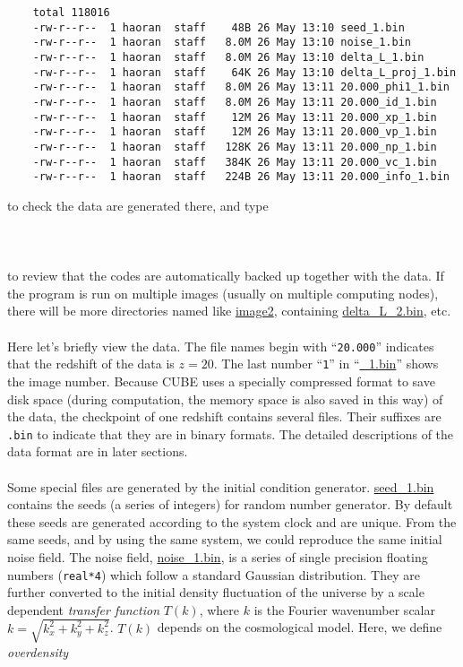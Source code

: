 \documentclass[12pt]{article}
\begin{document}
\begin{verbatim}
    total 118016
    -rw-r--r--  1 haoran  staff    48B 26 May 13:10 seed_1.bin
    -rw-r--r--  1 haoran  staff   8.0M 26 May 13:10 noise_1.bin
    -rw-r--r--  1 haoran  staff   8.0M 26 May 13:10 delta_L_1.bin
    -rw-r--r--  1 haoran  staff    64K 26 May 13:10 delta_L_proj_1.bin
    -rw-r--r--  1 haoran  staff   8.0M 26 May 13:11 20.000_phi1_1.bin
    -rw-r--r--  1 haoran  staff   8.0M 26 May 13:11 20.000_id_1.bin
    -rw-r--r--  1 haoran  staff    12M 26 May 13:11 20.000_xp_1.bin
    -rw-r--r--  1 haoran  staff    12M 26 May 13:11 20.000_vp_1.bin
    -rw-r--r--  1 haoran  staff   128K 26 May 13:11 20.000_np_1.bin
    -rw-r--r--  1 haoran  staff   384K 26 May 13:11 20.000_vc_1.bin
    -rw-r--r--  1 haoran  staff   224B 26 May 13:11 20.000_info_1.bin
\end{verbatim}
to check the data are generated there, and type
\\\\
\\\\
to review that the codes are automatically backed up together with the data. If the program is run on multiple images (usually on multiple computing nodes), there will be more directories named like \url{image2}, containing \url{delta_L_2.bin}, etc.
\\\\
Here let's briefly view the data. The file names begin with ``{\tt 20.000}'' indicates that the redshift of the data is $z=20$. The last number ``{\tt 1}'' in ``\url{_1.bin}'' shows the image number. Because CUBE uses a specially compressed format to save disk space (during computation, the memory space is also saved in this way) of the data, the checkpoint of one redshift contains several files. Their suffixes are {\tt *.bin} to indicate that they are in binary formats. The detailed descriptions of the data format are in later sections.
\\\\
Some special files are generated by the initial condition generator. \url{seed_1.bin} contains the seeds (a series of integers) for random number generator. By default these seeds are generated according to the system clock and are unique. From the same seeds, and by using the same system, we could reproduce the same initial noise field. The noise field, \url{noise_1.bin}, is a series of single precision floating numbers ({\tt real*4}) which follow a standard Gaussian distribution. 
They are further converted to the initial density fluctuation of the universe by a scale dependent {\it transfer function} $T(k)$, where $k$ is the Fourier wavenumber scalar $k=\sqrt{k_x^2+k_y^2+k_z^2}$. $T(k)$ depends on the cosmological model. Here, we define {\it overdensity}
\end{document}
